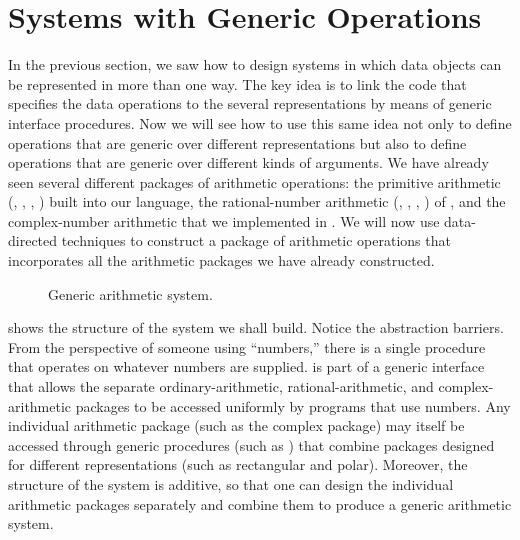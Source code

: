 \section{Systems with Generic Operations}
\label{Section 2.5}

In the previous section, we saw how to design systems in which data objects can be represented in more than one way.
The key idea is to link the code that specifies the data operations to the several representations by means of generic interface procedures.
Now we will see how to use this same idea not only to define operations that are generic over different representations but also to define operations that are generic over different kinds of arguments.
We have already seen several different packages of arithmetic operations:
the primitive arithmetic (\code{+}, \code{-}, \code{*}, \code{/}) built into our language, the rational-number arithmetic (, , , ) of , and the complex-number arithmetic that we implemented in .
We will now use data-directed techniques to construct a package of arithmetic operations that incorporates all the arithmetic packages we have already constructed.

\begin{figure}[tb]
	\centering
	
	\caption{Generic arithmetic system.}
	\label{Figure 2.23}
\end{figure}

 shows the structure of the system we shall build.
Notice the abstraction barriers.
From the perspective of someone using “numbers,” there is a single procedure  that operates on whatever numbers are supplied.
 is part of a generic interface that allows the separate ordinary-arithmetic, rational-arithmetic, and complex-arithmetic packages to be accessed uniformly by programs that use numbers.
Any individual arithmetic package (such as the complex package) may itself be accessed through generic procedures (such as ) that combine packages designed for different representations (such as rectangular and polar).
Moreover, the structure of the system is additive, so that one can design the individual arithmetic packages separately and combine them to produce a generic arithmetic system.




